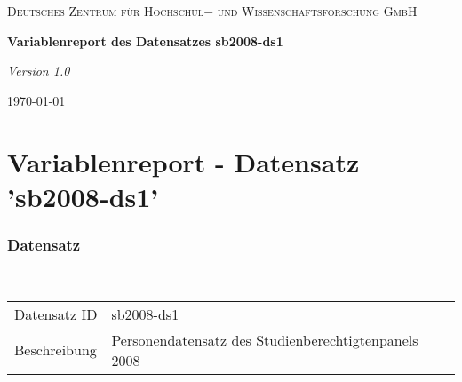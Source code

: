 \begin{titlepage}
	\centering
	{\scshape \LARGE Deutsches Zentrum für Hochschul$-$ und Wissenschaftsforschung GmbH \par}
	\vspace{2.5cm}
	{\huge\bfseries Variablenreport des Datensatzes sb2008-ds1\par}
	\vspace{2.5cm}
	{\Large\itshape Version 1.0\par}
	\vfill	
	{\large \today\par}
\end{titlepage}

\tableofcontents
\newpage

\part{Variablenreport - Datensatz 'sb2008-ds1'}
\section{Datensatz}

\noindent \\
\noindent
\begin{tabular}{@{}ll}
	Datensatz ID & sb2008-ds1 \\
	Beschreibung & Personendatensatz des Studienberechtigtenpanels 2008 \\
\end{tabular}	
